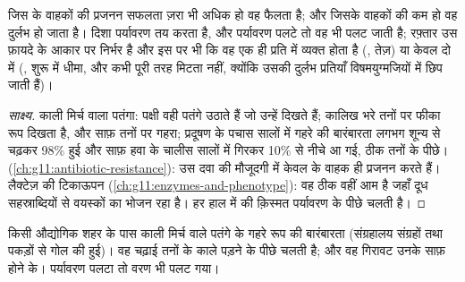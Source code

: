\begin{proposition}\label{prop:g12:selection-drift-speciation:direction}
जिस  के वाहकों की प्रजनन सफलता ज़रा भी अधिक हो वह फैलता है; और
जिसके वाहकों की कम हो वह दुर्लभ हो जाता है। दिशा पर्यावरण तय करता है, और
पर्यावरण पलटे तो वह भी पलट जाती है; रफ़्तार उस फ़ायदे के आकार पर निर्भर है
और इस पर भी कि वह  एक ही प्रति में व्यक्त होता है (,
तेज़) या केवल दो में (, शुरू में धीमा, और कभी पूरी तरह मिटता नहीं,
क्योंकि उसकी दुर्लभ प्रतियाँ विषमयुग्मजियों में छिप जाती हैं)।
\end{proposition}
\begin{proof}[साक्ष्य]
काली मिर्च वाला पतंगा: पक्षी वही पतंगे उठाते हैं जो उन्हें दिखते हैं;
कालिख भरे तनों पर फीका रूप दिखता है, और साफ़ तनों पर गहरा; प्रदूषण के पचास
सालों में गहरे  की बारंबारता लगभग शून्य से चढ़कर 98\% हुई और
साफ़ हवा के चालीस सालों में गिरकर 10\% से नीचे आ गई, ठीक तनों के पीछे।
 (\cref{ch:g11:antibiotic-resistance}): उस दवा की
मौजूदगी में केवल   के वाहक ही प्रजनन करते हैं।
लैक्टेज़ की टिकाऊपन (\cref{ch:g11:enzymes-and-phenotype}): वह 
ठीक वहीं आम है जहाँ दूध सहस्राब्दियों से वयस्कों का भोजन रहा है। हर हाल में
 की क़िस्मत पर्यावरण के पीछे चलती है।
\end{proof}

\begin{omfigure}

{\small किसी औद्योगिक शहर के पास काली मिर्च वाले पतंगे के गहरे रूप की
बारंबारता (संग्रहालय संग्रहों तथा पकड़ों से गोल की हुई)। वह चढ़ाई तनों के
काले पड़ने के पीछे चलती है; और वह गिरावट उनके साफ़ होने के। पर्यावरण पलटा
तो वरण भी पलट गया।}
\end{omfigure}

